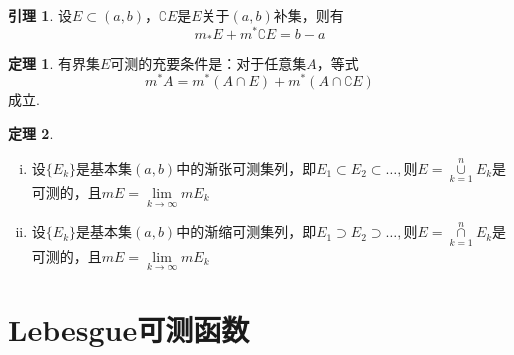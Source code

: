 \documentclass[oneside]{ctexbook}
\theoremstyle{definition} \newtheorem{defi}{定义}[section]
\theoremstyle{definition} \newtheorem{law}{定理}[section]
\theoremstyle{definition} \newtheorem{jury}{引理}[section]
\theoremstyle{remark} \newtheorem*{mar}{\heiti 推论}
\begin{document}
\begin{jury}
	设$E\subset (a,b)$，$\complement E$是$E$关于$(a,b)$补集，则有\[m_{*}E+m^{*}\complement E=b-a\]
\end{jury}
\begin{law}
	有界集$E$可测的充要条件是：对于任意集$A$，等式\[m^{*}A=m^{*}(A\cap E)+m^{*}(A\cap\complement E)\]成立.
\end{law}
\begin{law}
	\begin{enumerate}[(i)]
		\item 设$\{E_{k}\}$是基本集$(a,b)$中的渐张可测集列，即$E_{1}\subset E_{2}\subset\dots,$则$E=\overset{n}{\underset{k=1}\cup }E_{k}$是可测的，且$mE=\underset{k\rightarrow\infty}{\lim}mE_{k}$
		\item 设$\{E_{k}\}$是基本集$(a,b)$中的渐缩可测集列，即$E_{1}\supset E_{2}\supset\dots,$则$E=\overset{n}{\underset{k=1}\cap }E_{k}$是可测的，且$mE=\underset{k\rightarrow\infty}{\lim}mE_{k}$
	\end{enumerate}
	
\end{law}
\chapter{Lebesgue可测函数}
\end{document}
